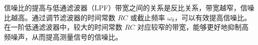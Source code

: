 \documentclass[dvipsnames, svgnames,a4paper,11pt]{article}
\begin{document}
信噪比的提高与低通滤波器（LPF）带宽之间的关系是反比关系，带宽越窄，信噪比越高。通过调节滤波器的时间常数 \( RC \) 或截止频率 \( \omega_0 \)，可以有效提高信噪比。在一阶低通滤波器中，较大的时间常数 \( RC \) 对应较窄的带宽，能够更好地抑制高频噪声，从而提高测量信号的信噪比。

\clearpage
{}




\end{document}
